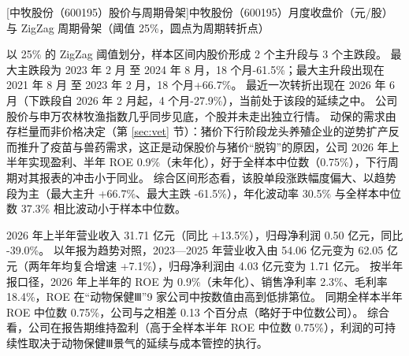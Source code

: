 \begin{center}
\begin{minipage}{\textwidth}\centering
{}

[中牧股份（600195）股价与周期骨架]{中牧股份（600195）月度收盘价（元/股）与 ZigZag 周期骨架（阈值 25\%，圆点为周期转折点）}
\end{minipage}
\end{center}

 以 25\% 的 ZigZag 阈值划分，样本区间内股价形成 2 个主升段与 3 个主跌段。 最大主跌段为 2023 年 2 月 至 2024 年 8 月，18 个月-61.5\%；最大主升段出现在 2021 年 8 月 至 2023 年 2 月，18 个月+66.7\%。 最近一次转折出现在 2026 年 6 月（下跌段自 2026 年 2 月起，4 个月-27.9\%），当前处于该段的延续之中。 公司股价与申万农林牧渔指数几乎同步见底，个股并未走出独立行情。 动保的需求由存栏量而非价格决定（第 \ref{sec:vet} 节）：猪价下行阶段龙头养殖企业的逆势扩产反而推升了疫苗与兽药需求，这正是动保股价与猪价“脱钩”的原因，公司 2026 年上半年实现盈利、半年 ROE 0.9\%（未年化），好于全样本中位数（0.75\%），下行周期对其报表的冲击小于同业。 综合区间形态看，该股单段涨跌幅度偏大、以趋势段为主（最大主升 +66.7\%、最大主跌 -61.5\%），年化波动率 30.5\% 与全样本中位数 37.3\% 相比波动小于样本中位数。

 2026 年上半年营业收入 31.71 亿元（同比 +13.5\%），归母净利润 0.50 亿元，同比 -39.0\%。 以年报为趋势对照，2023---2025 年营业收入由 54.06 亿元变为 62.05 亿元（两年年均复合增速 +7.1\%），归母净利润由 4.03 亿元变为 1.71 亿元。 按半年报口径，2026 年上半年的 ROE 为 0.9\%（未年化）、销售净利率 2.3\%、毛利率 18.4\%，ROE 在“动物保健Ⅲ”9 家公司中按数值由高到低排第位。 同期全样本半年 ROE 中位数 0.75\%，公司与之相差 0.13 个百分点（略好于中位数公司）。 综合看，公司在报告期维持盈利（高于全样本半年 ROE 中位数 0.75\%），利润的可持续性取决于动物保健Ⅲ景气的延续与成本管控的执行。

